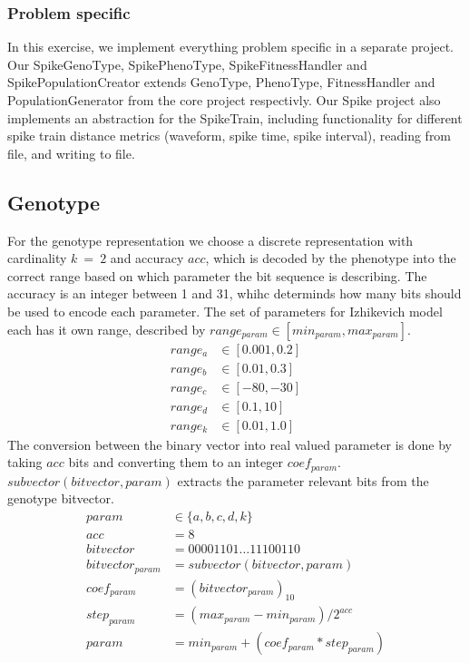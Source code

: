 \documentclass[10pt]{article}
\begin{document}
		\subsubsection{Problem specific}\label{sec:specific}
				In this exercise, we implement everything problem specific in a separate project. Our SpikeGenoType, SpikePhenoType, SpikeFitnessHandler and SpikePopulationCreator extends GenoType, PhenoType, FitnessHandler and PopulationGenerator from the core project respectivly.
		Our Spike project also implements an abstraction for the SpikeTrain, including functionality for different spike train distance metrics (waveform, spike time, spike interval), reading from file, and writing to file.
	\subsection{Genotype}\label{sec:geno}
		For the genotype representation we choose a discrete representation with cardinality $k~=~2$ and accuracy $acc$, which is decoded by the phenotype into the correct range based on which parameter the bit sequence is describing. The accuracy is an integer between 1 and 31, whihc determinds how many bits should be used to encode each parameter. The set of parameters for Izhikevich model each has it own range, described by $range_{param} \in [min_{param}, max_{param}]$. 
		\begin{align}
			range_a &\in [0.001, 0.2]\nonumber\\
			range_b &\in [0.01, 0.3]\nonumber\\
			range_c &\in [-80, -30]\nonumber\\
			range_d &\in [0.1, 10]\nonumber\\
			range_k &\in [0.01, 1.0]\nonumber
		\end{align}
		The conversion between the binary vector into real valued parameter is done by taking $acc$ bits and converting them to an integer $coef_{param}$. $subvector(bitvector, param)$ extracts the parameter relevant bits from the genotype bitvector.
		\begin{align}
			param &\in \{a, b, c, d, k\}\nonumber\\
			acc &= 8\nonumber\\
			bitvector &= 00001101\dots11100110\nonumber\\
			bitvector_{param} &= subvector(bitvector, param)\nonumber\\
			coef_{param} &= (bitvector_{param})_{10}\nonumber\\
			step_{param} &= (max_{param}-min_{param})/2^{acc}\nonumber\\
			param &= min_{param}+(coef_{param}*step_{param})\nonumber
		\end{align}
\end{document}
